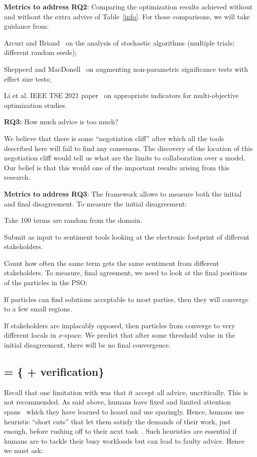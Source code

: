 {\bf Metrics to address  RQ2}: Comparing
the optimization results achieved without and without the extra advive of
Table~\ref{info}. For those comparisons, we will take   guidance from:
\bi
\item Arcuri and Briand~\cite{Arcuri11} on the analysis of stochastic algorithms  (multiple trials;    different random   seeds);
\item Shepperd and  MacDonell~\cite{SHEPPERD2012820}  on augmenting
 non-parametric significance tests with effect size tests;
 \item
 Li et al.   IEEE TSE 2021 paper~\cite{li20} on   appropriate indicators for  multi-objective optimization studies.
 \ei
 \begin{formal}
 {\bf RQ3:} How much advice
 is too much?
 \end{formal}
 We believe that there is some ``negotiation cliff''
after which all the tools described here
will fail to find any consensus. 
The discovery of the location of this negotiation cliff would tell us what are the limits to collaboration over a model. Our belief is that this would  one of the important results     arising from this research.

{\bf Metrics to address  RQ3}:
The   framework   allows to measure both the initial and final disagreement.
To measure the  initial disagreement:
\bi
\item
Take 100 terms are random from the domain.
\item
Submit as input to sentiment tools looking at the electronic footprint of different stakeholders.
\item
Count how often the same term gets the same sentiment from different stakeholders.
\ei
To measure, final agreement, we need to look at the final positions of the particles in the PSO:
\bi
\item If   particles can   find solutions acceptable to most parties, then  they will converge to a few small regions.
\item
 If    stakeholders are implacably opposed, then   particles from converge
 to very different locals in $x$-space.
\ei
We predict that after some threshold value in the initial disagreement, there will be no final convergence.



\subsection{ = \{ +  verification\}}
Recall that one limitation with   was that it accept all advice, uncritically. This
is not recommended. As said  above, 
humans have fixed and limited attention spans~\cite{davenport2001attention} 
   which they  have learned to hoard and use sparingly.  
Hence, humans  use heuristic ``short cuts'' that let 
them satisfy the demands of their work, just enough, before rushing off to their next
task~\cite{simon1956rational}.
Such heuristics are essential if humans are to tackle their busy workloads but
can lead to faulty advice. Hence we must ask:





